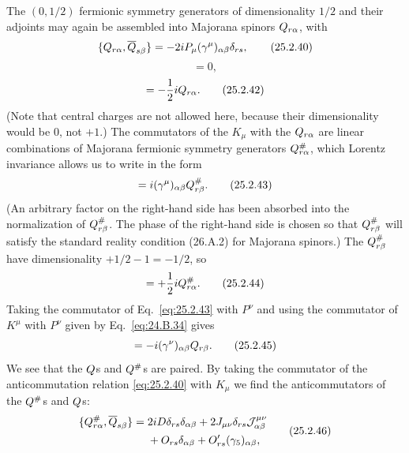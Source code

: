 The \((0,1/2)\) fermionic symmetry generators of dimensionality \(1/2\)
and their adjoints may again be assembled into Majorana spinors
\(Q_{r\alpha}\), with
\begin{equation}
\{Q_{r\alpha},\overline{Q}_{s\beta}\}
=-2iP_\mu(\gamma^\mu)_{\alpha\beta}\delta_{rs},
\tag{25.2.40}\label{eq:25.2.40}
\end{equation}
\begin{equation}
[P_\mu,\MajoranaQ_{r\alpha}]=0,
\tag{25.2.41}\label{eq:25.2.41}
\end{equation}
\begin{equation}
[D,\MajoranaQ_{r\alpha}]
=-\frac12i\MajoranaQ_{r\alpha}.
\tag{25.2.42}\label{eq:25.2.42}
\end{equation}
(Note that central charges are not allowed here, because their
dimensionality would be 0, not \(+1\).) The commutators of the \(K_\mu\)
with the \(Q_{r\alpha}\) are linear combinations of Majorana
fermionic symmetry generators \(Q^\#_{r\alpha}\), which Lorentz
invariance allows us to write in the form
\begin{equation}
[K^\mu,\MajoranaQ_{r\alpha}]
=i(\gamma^\mu)_{\alpha\beta}\MajoranaQ^\#_{r\beta}.
\tag{25.2.43}\label{eq:25.2.43}
\end{equation}
(An arbitrary factor on the right-hand side has been absorbed into the
normalization of \(Q^\#_{r\beta}\). The phase of the right-hand
side is chosen so that \(Q^\#_{r\beta}\) will satisfy the standard
reality condition (26.A.2) for Majorana spinors.) The
\(Q^\#_{r\beta}\) have dimensionality \(+1/2-1=-1/2\), so
\begin{equation}
[D,\MajoranaQ^\#_{r\alpha}]
=+\frac12i\MajoranaQ^\#_{r\alpha}.
\tag{25.2.44}\label{eq:25.2.44}
\end{equation}
Taking the commutator of Eq.~\eqref{eq:25.2.43} with \(P^\nu\) and using
the commutator of \(K^\mu\) with \(P^\nu\) given by
Eq.~\eqref{eq:24.B.34} gives
\begin{equation}
[P^\nu,\MajoranaQ^\#_{r\alpha}]
=-i(\gamma^\nu)_{\alpha\beta}\MajoranaQ_{r\beta}.
\tag{25.2.45}\label{eq:25.2.45}
\end{equation}
We see that the \(Q\)s and \(Q^\#\)s are paired. By
taking the commutator of the anticommutation relation \eqref{eq:25.2.40}
with \(K_\mu\) we find the anticommutators of the
\(Q^\#\)s and \(Q\)s:
\begin{equation}
\begin{aligned}
\{Q^\#_{r\alpha},\overline{Q}_{s\beta}\}
={}&2iD\delta_{rs}\delta_{\alpha\beta}
+2J_{\mu\nu}\delta_{rs}\mathcal J^{\mu\nu}_{\alpha\beta}
\\
&{}+O_{rs}\delta_{\alpha\beta}
+O'_{rs}(\gamma_5)_{\alpha\beta},
\end{aligned}
\tag{25.2.46}\label{eq:25.2.46}
\end{equation}

